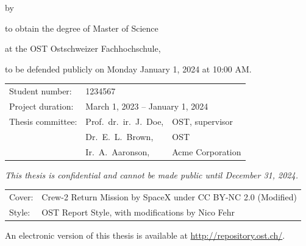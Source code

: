 \begin{titlepage}

\begin{center}

{\makeatletter
\largetitlestyle\fontsize{45}{45}\selectfont\@title
\makeatother}

{\makeatletter
\ifdefvoid{\@subtitle}{}{\bigskip\titlestyle\fontsize{20}{20}\selectfont\@subtitle}
\makeatother}

\bigskip
\bigskip

by

\bigskip
\bigskip

{\makeatletter
\largetitlestyle\fontsize{25}{25}\selectfont\@author
\makeatother}

\bigskip
\bigskip

to obtain the degree of Master of Science

at the OST Ostschweizer Fachhochschule,

to be defended publicly on Monday January 1, 2024 at 10:00 AM.

\vfill

\begin{tabular}{lll}
    Student number: & 1234567 \\
    Project duration: & \multicolumn{2}{l}{March 1, 2023 -- January 1, 2024} \\
    Thesis committee: & Prof.\ dr.\ ir.\ J.\ Doe, & OST, supervisor \\
        & Dr.\ E.\ L.\ Brown, & OST \\
        & Ir.\ A.\ Aaronson, & Acme Corporation
\end{tabular}

\bigskip
\bigskip
\emph{This thesis is confidential and cannot be made public until December 31, 2024.}

\bigskip
\bigskip

\begin{tabular}{p{15mm}p{10cm}}
  Cover: & Crew-2 Return Mission by SpaceX under CC BY-NC 2.0 (Modified) \\
  Style: & OST Report Style, with modifications by Nico Fehr
\end{tabular}

\bigskip
\bigskip
An electronic version of this thesis is available at \url{http://repository.ost.ch/}.


\end{center}

\end{titlepage}
